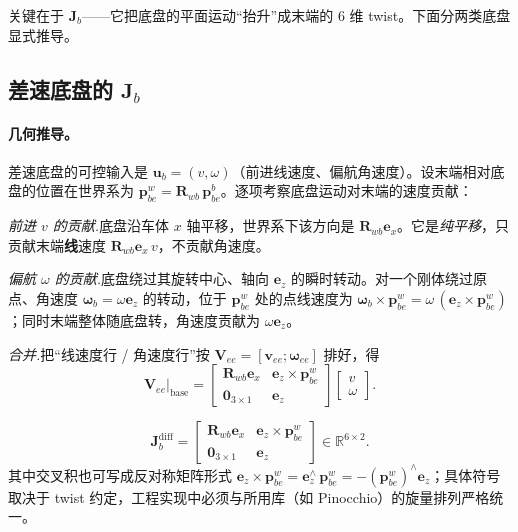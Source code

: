 \noindent 关键在于 $\mathbf{J}_b$——它把底盘的平面运动“抬升”成末端的 $6$ 维 twist。下面分两类底盘显式推导。

\subsection{差速底盘的 \texorpdfstring{$\mathbf{J}_b$}{Jb}}
\label{sec:mmk-jac-diff}

\paragraph{几何推导。}
差速底盘的可控输入是 $\mathbf{u}_b=(v,\omega)$（前进线速度、偏航角速度）。设末端相对底盘的位置在世界系为 $\mathbf{p}_{be}^w=\mathbf{R}_{wb}\,\mathbf{p}_{be}^b$。逐项考察底盘运动对末端的速度贡献：

\begin{derivation}
\emph{前进 $v$ 的贡献.}\;底盘沿车体 $x$ 轴平移，世界系下该方向是 $\mathbf{R}_{wb}\mathbf{e}_x$。它是\emph{纯平移}，只贡献末端\textbf{线}速度 $\mathbf{R}_{wb}\mathbf{e}_x\,v$，不贡献角速度。

\emph{偏航 $\omega$ 的贡献.}\;底盘绕过其旋转中心、轴向 $\mathbf{e}_z$ 的瞬时转动。对一个刚体绕过原点、角速度 $\boldsymbol{\omega}_b=\omega\mathbf{e}_z$ 的转动，位于 $\mathbf{p}_{be}^w$ 处的点线速度为 $\boldsymbol{\omega}_b\times\mathbf{p}_{be}^w=\omega\,(\mathbf{e}_z\times\mathbf{p}_{be}^w)$；同时末端整体随底盘转，角速度贡献为 $\omega\mathbf{e}_z$。

\emph{合并.}\;把“线速度行 / 角速度行”按 $\mathbf{V}_{ee}=[\mathbf{v}_{ee};\boldsymbol{\omega}_{ee}]$ 排好，得
\begin{equation}
  \mathbf{V}_{ee}\big|_{\text{base}}=
  \begin{bmatrix}\mathbf{R}_{wb}\mathbf{e}_x & \mathbf{e}_z\times\mathbf{p}_{be}^w\\[2pt]
  \mathbf{0}_{3\times1} & \mathbf{e}_z\end{bmatrix}
  \begin{bmatrix}v\\\omega\end{bmatrix}.
  \label{eq:mmk-Jb-diff-deriv}
\end{equation}
\end{derivation}

\begin{proposition}\label{prop:mmk-Jb-diff}
\begin{equation}
  \boxed{\;\mathbf{J}_b^{\text{diff}}=
  \begin{bmatrix}\mathbf{R}_{wb}\mathbf{e}_x & \mathbf{e}_z\times\mathbf{p}_{be}^w\\[2pt]
  \mathbf{0}_{3\times1} & \mathbf{e}_z\end{bmatrix}\in\mathbb{R}^{6\times2}.\;}
  \label{eq:mmk-Jb-diff}
\end{equation}
其中交叉积也可写成反对称矩阵形式 $\mathbf{e}_z\times\mathbf{p}_{be}^w=\mathbf{e}_z^\wedge\,\mathbf{p}_{be}^w=-(\mathbf{p}_{be}^w)^\wedge\mathbf{e}_z$；具体符号取决于 twist 约定，工程实现中必须与所用库（如 Pinocchio）的旋量排列严格统一。
\end{proposition}

